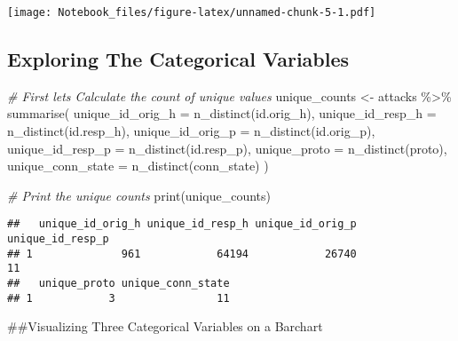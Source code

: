 \documentclass[
]{article}
\newenvironment{Shaded}{\begin{snugshade}}{\end{snugshade}}
\newcommand{\AttributeTok}[1]{\textcolor[rgb]{0.77,0.63,0.00}{#1}}
\newcommand{\CommentTok}[1]{\textcolor[rgb]{0.56,0.35,0.01}{\textit{#1}}}
\newcommand{\FunctionTok}[1]{\textcolor[rgb]{0.00,0.00,0.00}{#1}}
\newcommand{\NormalTok}[1]{#1}
\newcommand{\OtherTok}[1]{\textcolor[rgb]{0.56,0.35,0.01}{#1}}
\newcommand{\SpecialCharTok}[1]{\textcolor[rgb]{0.00,0.00,0.00}{#1}}
\begin{document}
\texttt{[image: Notebook\_files/figure-latex/unnamed-chunk-5-1.pdf]}

\hypertarget{exploring-the-categorical-variables}{%
\subsection{Exploring The Categorical
Variables}\label{exploring-the-categorical-variables}}

\begin{Shaded}
\begin{Highlighting}[]
\CommentTok{\# First lets Calculate the count of unique values}
\NormalTok{unique\_counts }\OtherTok{\textless{}{-}}\NormalTok{ attacks }\SpecialCharTok{\%\textgreater{}\%}
  \FunctionTok{summarise}\NormalTok{(}
    \AttributeTok{unique\_id\_orig\_h =} \FunctionTok{n\_distinct}\NormalTok{(id.orig\_h),}
    \AttributeTok{unique\_id\_resp\_h =} \FunctionTok{n\_distinct}\NormalTok{(id.resp\_h),}
    \AttributeTok{unique\_id\_orig\_p =} \FunctionTok{n\_distinct}\NormalTok{(id.orig\_p),}
    \AttributeTok{unique\_id\_resp\_p =} \FunctionTok{n\_distinct}\NormalTok{(id.resp\_p),}
    \AttributeTok{unique\_proto =} \FunctionTok{n\_distinct}\NormalTok{(proto),}
    \AttributeTok{unique\_conn\_state =} \FunctionTok{n\_distinct}\NormalTok{(conn\_state)}
\NormalTok{  )}

\CommentTok{\# Print the unique counts}
\FunctionTok{print}\NormalTok{(unique\_counts)}
\end{Highlighting}
\end{Shaded}

\begin{verbatim}
##   unique_id_orig_h unique_id_resp_h unique_id_orig_p unique_id_resp_p
## 1              961            64194            26740               11
##   unique_proto unique_conn_state
## 1            3                11
\end{verbatim}

\#\#Visualizing Three Categorical Variables on a Barchart
\end{document}
